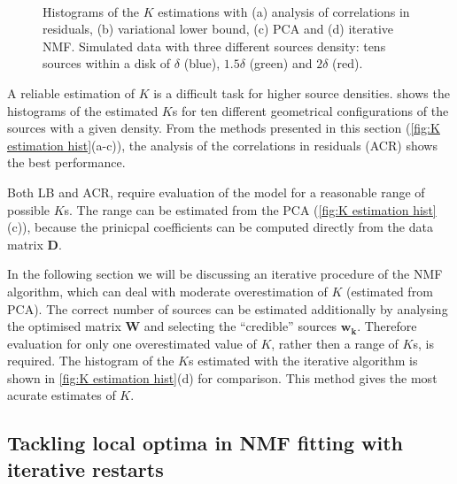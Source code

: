 \begin{figure}[!hbt]
	\newcommand{\sizef}{.4}		
	\centering
	\\
	\caption{Histograms of the $K$ estimations with (a) analysis of correlations in residuals, (b) variational lower bound, (c) PCA and (d) iterative NMF. Simulated data with three different sources density: tens sources within a disk of $\delta$ (blue), $1.5\delta$ (green) and $2\delta$ (red).}
	\label{fig:K estimation hist}
\end{figure}
%
A reliable estimation of $K$ is a difficult task for higher source densities.  shows the histograms of the estimated $K$s for ten different geometrical configurations of the sources with a given density. From the methods presented in this section  (\autoref{fig:K estimation hist}(a-c)), the analysis of the correlations in residuals (ACR) shows the best performance.

Both LB and ACR, require evaluation of the model for a reasonable range of possible $K$s. The range can be estimated from the PCA  (\autoref{fig:K estimation hist}(c)), because the prinicpal coefficients can be computed directly from the data matrix $\bm{D}$.

In the following section we will be discussing an iterative procedure of the NMF algorithm, which can deal with moderate overestimation of $K$  (estimated from PCA). The correct number of sources can be estimated additionally by analysing the optimised matrix $\bm{W}$ and selecting the ``credible'' sources $\bm{w_{k}}$. Therefore evaluation for only one overestimated value of $K$, rather then a range of $K$s, is required. The histogram of the $K$s estimated with the iterative algorithm is shown in  \autoref{fig:K estimation hist}(d) for comparison. This method gives the most acurate estimates of $K$. 

\clearpage
\subsection{Tackling local optima in NMF fitting with iterative restarts \label{sub: Iterative restarts}}

